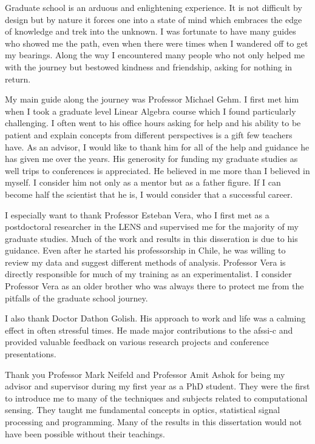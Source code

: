 Graduate school is an arduous and enlightening experience. It is not difficult by design but by nature it forces one into a state of mind which embraces the edge of knowledge and trek into the unknown. I was fortunate to have many guides who showed me the path, even when there were times when I wandered off to get my bearings. Along the way I encountered many people who not only helped me with the journey but bestowed kindness and friendship, asking for nothing in return.

My main guide along the journey was Professor Michael Gehm. I first met him when I took a graduate level Linear Algebra course which I found particularly challenging. I often went to his office hours asking for help and his ability to be patient and explain concepts from different perspectives is a gift few teachers have. As an advisor, I would like to thank him for all of the help and guidance he has given me over the years. His generosity for funding my graduate studies as well trips to conferences is appreciated. He believed in me more than I believed in myself. I consider him not only as a mentor but as a father figure. If I can become half the scientist that he is, I would consider that a successful career.

I especially want to thank Professor Esteban Vera, who I first met as a postdoctoral researcher in the \gls{LENS} and supervised me for the majority of my graduate studies. Much of the work and results in this disseration is due to his guidance. Even after he started his professorship in Chile, he was willing to review my data and suggest different methods of analysis. Professor Vera is directly responsible for much of my training as an experimentalist. I consider Professor Vera as an older brother who was always there to protect me from the pitfalls of the graduate school journey. 

I also thank Doctor Dathon Golish. His approach to work and life was a calming effect in often stressful times. He made major contributions to the \gls{afssi-c} and provided valuable feedback on various research projects and conference presentations.

Thank you Professor Mark Neifeld and Professor Amit Ashok for being my advisor and supervisor during my first year as a PhD student. They were the first to introduce me to many of the techniques and subjects related to computational sensing. They taught me fundamental concepts in optics, statistical signal processing and programming. Many of the results in this dissertation would not have been possible without their teachings.


